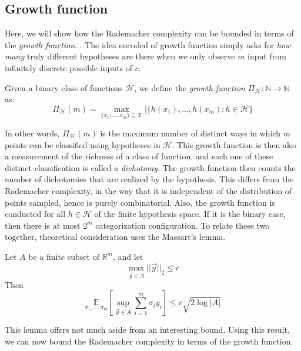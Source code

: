 \subsection{Growth function}

Here, we will show how the Rademacher complexity can be bounded in terms of the \textit{growth function}. . The idea encoded of growth function simply asks for \textit{how many} truly different hypotheses are there when we only observe $m$ input from infinitely discrete possible inputs of $c$. 
\begin{definition}
    Given a binary class of functions $\mathcal{H}$, we define the \textit{growth function} $\Pi_{\mathcal{H}}: \mathbb{N}\to \mathbb{N}$ as: 
    \begin{equation}
        \Pi_{\mathcal{H}} (m) = \max_{\{x_1, \dots, x_m\}\subseteq \mathcal{X}} \lvert \{h(x_1),\dots, h(x_m): h\in \mathcal{H}\}
    \end{equation} 
\end{definition}
In other words, $\Pi_{\mathcal{H}}(m)$ is the maximum number of distinct ways in which $m$ points can be classified using hypotheses in $\mathcal{H}$. This growth function is then also a measurement of the richness of a class of function, and each one of these distinct classification is called a \textit{dichotomy}. The growth function then counts the number of dichotomies that are realized by the hypothesis. This differs from the Rademacher complexity, in the way that it is independent of the distribution of points sampled, hence is purely combinatorial. Also, the growth function is conducted for all $h\in \mathcal{H}$ of the finite hypothesis space. If it is the binary case, then there is at most $2^{m}$ categorization configuration. To relate these two together, theoretical consideration uses the Massart's lemma. 
\begin{lemma}
    Let $A$ be a finite subset of $\mathbb{R}^{m}$, and let $$\max_{\vec{y}\in A} \lvert\lvert \vec{y}\rvert\rvert_{2} \leq r$$
    Then 
    \begin{equation}
        \underset{\sigma_{1},\dots,\sigma_{m}}{\mathbb{E}} \left[\sup_{\vec{y}\in A} \sum^{m}_{i=1}\sigma_{i} y_{i} \right] \leq r \sqrt{2\log{\lvert A \rvert}}
    \end{equation}
\end{lemma}
This lemma offers not much aside from an interesting bound. Using this result, we can now bound the Rademacher complexity in terms of the growth function. 
